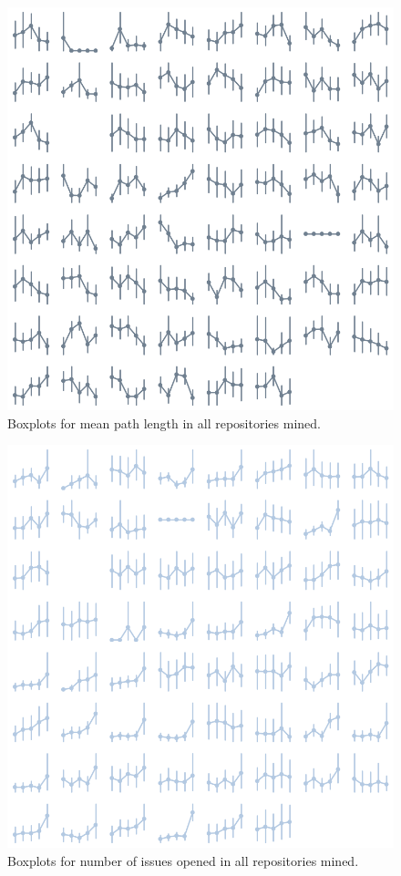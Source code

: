 \begin{appendices}
    \begin{figure}[!htb]
        \centering
        \includegraphics[width=\textwidth]{figures/quantitative/pointplots/mean_path_length_all.png}
        \caption{Boxplots for mean path length in all repositories mined.}
        \label{app:mean_path-box-app}
    \end{figure}

    \begin{figure}[!htb]
        \centering
        \includegraphics[width=\textwidth]{figures/quantitative/pointplots/issues_opened_all.png}
        \caption{Boxplots for number of issues opened in all repositories mined.}
        \label{app:issues_opened-box-app}
    \end{figure}


\end{appendices}

